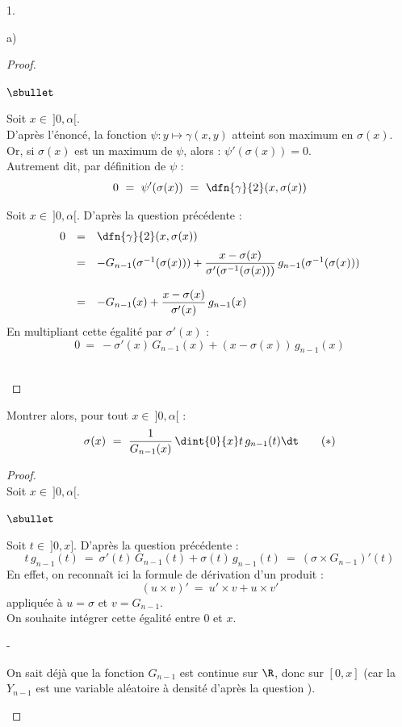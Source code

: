 \documentclass[11pt]{article}%
\begin{document}
\begin{noliste}{1.}
\begin{noliste}{a)}
    \begin{proof}~
      \begin{noliste}{$\sbullet$}
	\item Soit $x \in \ ]0,\alpha[$.\\
	D'après l'énoncé, la fonction $\psi : y \mapsto 
	\gamma(x,y)$ atteint son maximum en $\sigma(x)$.\\
	Or, si $\sigma(x)$ est un maximum de $\psi$, alors : 
	$\psi'(\sigma(x))=0$.\\
	Autrement dit, par définition de $\psi$ :
	\[
	  0 \ = \ \psi'(\sigma(x)) \ = \ \dfn{\gamma}{2}(x, \sigma(x))
	\]
	\conc{$\forall x \in \ ]0,\alpha[$, $\dfn{\gamma}{2}(x,
	\sigma(x)) = 0$}
	
	
	
	
	\item Soit $x \in \ ]0,\alpha[$. D'après la question 
	précédente :
	\[
	  \begin{array}{rcl}
	    0 & = & \dfn{\gamma}{2}(x, \sigma(x))
	    \\[.2cm]
	    & = & - G_{n-1}(\sigma^{-1}(\sigma(x))) + 
	    \dfrac{x - \sigma(x)}{\sigma'(\sigma^{-1}(\sigma(x)))}
	    \, g_{n-1}(\sigma^{-1}(\sigma(x)))
	    \\[.6cm]
	    & = & -G_{n-1}(x) + \dfrac{x - \sigma(x)}{\sigma'(x)}
	    \, g_{n-1}(x)
	  \end{array}
	\]
	En multipliant cette égalité par $\sigma'(x)$ :
	\[
	  0 \ = \ -\sigma'(x) \, G_{n-1}(x) + (x-\sigma(x)) \, 
	  g_{n-1}(x)
	\]
	\conc{D'où : $\forall x \in \ ]0,\alpha[$, $\sigma'(x) \,
	G_{n-1}(x) + \sigma(x) \, g_{n-1}(x) \ = \ x \, 
	g_{n-1}(x)$.}~\\[-1.4cm]
      \end{noliste}
    \end{proof}

    
    \item Montrer alors, pour tout $x \in \ ]0,\alpha[$ : 
    \[
      \sigma(x) \ = \ \dfrac{1}{G_{n-1}(x)} \, \dint{0}{x} t \, 
      g_{n-1}(t) \dt \qquad (*)
    \]
    
    \begin{proof}~\\
      Soit $x \in \ ]0,\alpha[$. 
      \begin{noliste}{$\sbullet$}
	\item Soit $t \in \ ]0,x]$.
	D'après la question précédente :
	\[
	  t \, g_{n-1}(t) \ = \ \sigma'(t) \, G_{n-1}(t) + \sigma(t) \,
	  g_{n-1}(t) \ = \ (\sigma \times G_{n-1})'(t)
	\]
	En effet, on reconnaît ici la formule de dérivation d'un 
	produit :
        \[
          (u \times v)' \ = \ u' \times v + u \times v'
        \]
        appliquée à $u = \sigma$ et $v = G_{n-1}$.\\[.1cm]
	On souhaite intégrer cette égalité entre $0$ et $x$.
	\begin{noliste}{-}
	  \item On sait déjà que la fonction $G_{n-1}$ est continue 
	  sur $\R$, donc sur $[0,x]$ (car la \var $Y_{n-1}$ est une 
	  variable aléatoire à densité d'après la question ).
	  

\end{noliste}
\end{noliste}
\end{proof}
\end{noliste}
\end{noliste}
\end{document}
